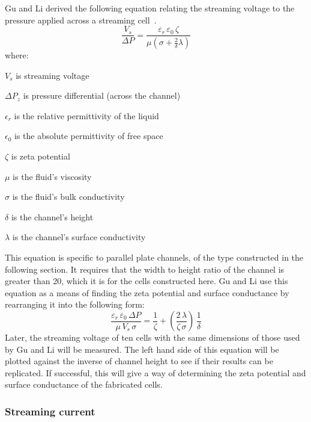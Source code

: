       Gu and Li derived the following equation relating the streaming voltage to the pressure applied across a streaming cell~\cite{Gu2000}.
      \begin{equation}
      \frac{V_{s}}{\Delta P} = \frac{\varepsilon_{r}\,\varepsilon_{0}\,\zeta}{\mu(\sigma+\frac{2}{\delta}\lambda)}
      \label{eq:part1_energyHarvesting_streamingVoltage}
      \end{equation}
      \noindent where:
      \begin{description}
          \item $V_{s}$ is streaming voltage
          \item $\Delta P_{z}$ is pressure differential (across the channel)
          \item $\epsilon_{r}$ is the relative permittivity of the liquid
          \item $\epsilon_{0}$ is the absolute permittivity of free space
          \item $\zeta$ is zeta potential
          \item $\mu$ is the fluid's viscosity
          \item $\sigma$ is the fluid's bulk conductivity
          \item $\delta$ is the channel's height
          \item $\lambda$ is the channel's surface conductivity
      \end{description}
      This equation is specific to parallel plate channels, of the type constructed in the following section.
      It requires that the width to height ratio of the channel is greater than 20, which it is for the cells constructed here.
      Gu and Li use this equation as a means of finding the zeta potential and surface conductance by rearranging it into the following form:
      \begin{equation}
        \frac{\varepsilon_{r}\, \varepsilon_{0}\, \Delta P}{\mu\, V_{s}\, \sigma} = \frac{1}{\zeta} + \left(\frac{2\, \lambda}{\zeta\, \sigma}\right)\, \frac{1}{\delta}
      \end{equation}
      Later, the streaming voltage of ten cells with the same dimensions of those used by Gu and Li will be measured.
      The left hand side of this equation will be plotted against the inverse of channel height to see if their results can be replicated.
      If successful, this will give a way of determining the zeta potential and surface conductance of the fabricated cells.


    \subsubsection*{Streaming current}


